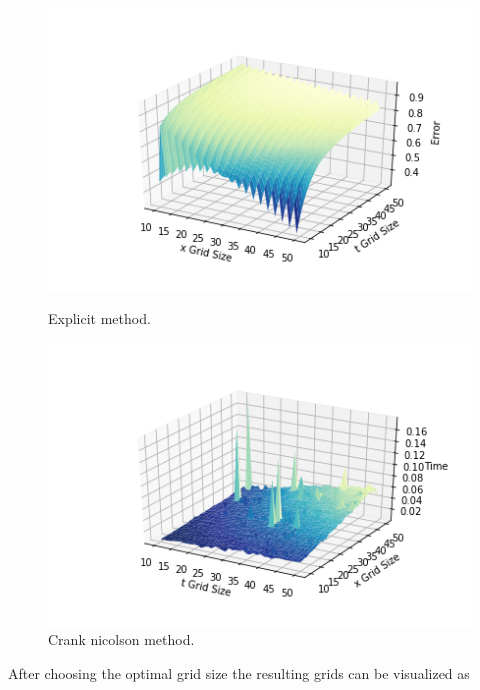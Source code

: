 \documentclass[12pt, oneside]{book}
\theoremstyle{plain}
\theoremstyle{definition}
\begin{document}
\begin{figure}[!htb]
  \begin{minipage}[b]{0.5\textwidth}
    \includegraphics[width=\textwidth]{BSExplicitGridError.png}
    \caption{Explicit method.}
  \end{minipage}
  \begin{minipage}[b]{0.5\textwidth}
    \includegraphics[width=\textwidth]{BSExplicitGridTimer.png}
    \caption{Crank nicolson method.}
  \end{minipage}
\end{figure}

After choosing the optimal grid size the resulting grids can be visualized as
\end{document}
